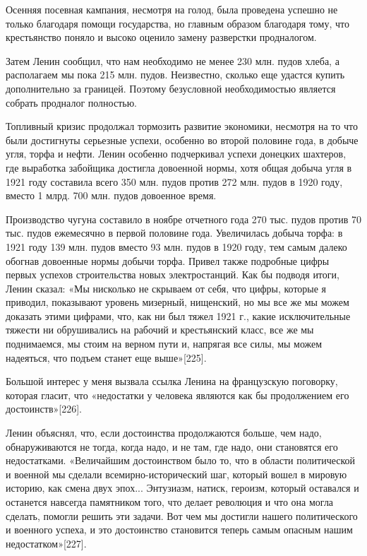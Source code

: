 \documentclass[12pt, a4paper, openany]{book}
\begin{document}
Осенняя посевная кампания, несмотря на голод, была проведена успешно не только благодаря помощи государства, но главным образом благодаря тому, что крестьянство поняло и высоко оценило замену разверстки продналогом.

Затем Ленин сообщил, что нам необходимо не менее 230 млн. пудов хлеба, а располагаем мы пока 215 млн. пудов. Неизвестно, сколько еще удастся купить дополнительно за границей. Поэтому безусловной необходимостью является собрать продналог полностью.

Топливный кризис продолжал тормозить развитие экономики, несмотря на то что были достигнуты серьезные успехи, особенно во второй половине года, в добыче угля, торфа и нефти. Ленин особенно подчеркивал успехи донецких шахтеров, где выработка забойщика достигла довоенной нормы, хотя общая добыча угля в 1921 году составила всего 350 млн. пудов против 272 млн. пудов в 1920 году, вместо 1 млрд. 700 млн. пудов довоенное время.

Производство чугуна составило в ноябре отчетного года 270 тыс. пудов против 70 тыс. пудов ежемесячно в первой половине года. Увеличилась добыча торфа: в 1921 году 139 млн. пудов вместо 93 млн. пудов в 1920 году, тем самым далеко обогнав довоенные нормы добычи торфа. Привел также подробные цифры первых успехов строительства новых электростанций. Как бы подводя итоги, Ленин сказал: «Мы нисколько не скрываем от себя, что цифры, которые я приводил, показывают уровень мизерный, нищенский, но мы все же мы можем доказать этими цифрами, что, как ни был тяжел 1921 г., какие исключительные тяжести ни обрушивались на рабочий и крестьянский класс, все же мы поднимаемся, мы стоим на верном пути и, напрягая все силы, мы можем надеяться, что подъем станет еще выше»[225].

Большой интерес у меня вызвала ссылка Ленина на французскую поговорку, которая гласит, что «недостатки у человека являются как бы продолжением его достоинств»[226].

Ленин объяснял, что, если достоинства продолжаются больше, чем надо, обнаруживаются не тогда, когда надо, и не там, где надо, они становятся его недостатками. «Величайшим достоинством было то, что в области политической и военной мы сделали всемирно-исторический шаг, который вошел в мировую историю, как смена двух эпох... Энтузиазм, натиск, героизм, который оставался и останется навсегда памятником того, что делает революция и что она могла сделать, помогли решить эти задачи. Вот чем мы достигли нашего политического и военного успеха, и это достоинство становится теперь самым опасным нашим недостатком»[227].
\end{document}
